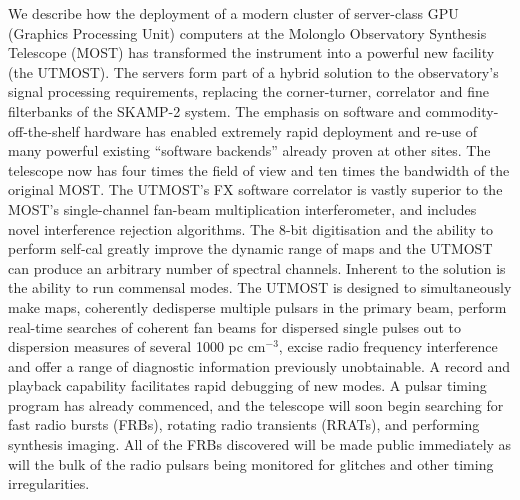 We describe how the deployment of a modern cluster of server-class GPU (Graphics Processing Unit) computers at the Molonglo Observatory Synthesis Telescope (MOST) has transformed the instrument into a powerful new facility (the UTMOST). The servers form part of a hybrid solution to the observatory's signal processing requirements, replacing the corner-turner, correlator and fine filterbanks of the SKAMP-2 system. The emphasis on software and commodity-off-the-shelf hardware has enabled extremely rapid deployment and re-use of many powerful existing ``software backends'' already proven at other sites. The telescope now has four times the field of view and ten times the bandwidth of the original MOST. The UTMOST's FX software correlator is vastly superior to the MOST's single-channel fan-beam multiplication interferometer, and includes novel interference rejection algorithms. The 8-bit digitisation and the ability to perform self-cal greatly improve the dynamic range of maps and the UTMOST can produce an arbitrary number of spectral channels. Inherent to the solution is the ability to run commensal modes. The UTMOST is designed to simultaneously make maps, coherently dedisperse multiple pulsars in the primary beam, perform real-time searches of coherent fan beams for dispersed single pulses out to dispersion measures of several 1000 pc cm$^{-3}$, excise radio frequency interference and offer a range of diagnostic information previously unobtainable. A record and playback capability facilitates rapid debugging of new modes. A pulsar timing program has already commenced, and the telescope will soon begin searching for fast radio bursts (FRBs), rotating radio transients (RRATs), and performing synthesis imaging. All of the FRBs discovered will be made public immediately as will the bulk of the radio pulsars being monitored for glitches and other timing irregularities. 
